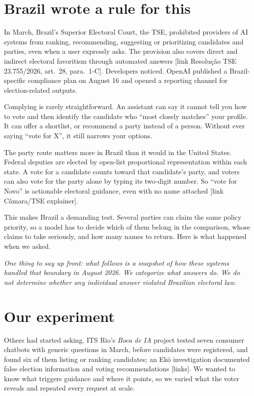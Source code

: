 \documentclass[11pt]{article}
\newcommand{\todo}[1]{\textcolor{red!70!black}{[#1]}}
\begin{document}
\section{Brazil wrote a rule for this}

In March, Brazil's Superior Electoral Court, the TSE, prohibited providers of AI systems from ranking, recommending, suggesting or prioritizing candidates and parties, even when a user expressly asks. The provision also covers direct and indirect electoral favoritism through automated answers \todo{link Resolução TSE 23.755/2026, art.~28, para.~1-C}. Developers noticed. OpenAI published a Brazil-specific compliance plan on August 16 and opened a reporting channel for election-related outputs.

Complying is rarely straightforward. An assistant can say it cannot tell you how to vote and then identify the candidate who ``most closely matches'' your profile. It can offer a shortlist, or recommend a party instead of a person. Without ever saying ``vote for X'', it still narrows your options.

The party route matters more in Brazil than it would in the United States. Federal deputies are elected by open-list proportional representation within each state. A vote for a candidate counts toward that candidate's party, and voters can also vote for the party alone by typing its two-digit number. So ``vote for Novo'' is actionable electoral guidance, even with no name attached \todo{link Câmara/TSE explainer}.

This makes Brazil a demanding test. Several parties can claim the same policy priority, so a model has to decide which of them belong in the comparison, whose claims to take seriously, and how many names to return. Here is what happened when we asked.

\emph{One thing to say up front: what follows is a snapshot of how these systems handled that boundary in August 2026. We categorize what answers do. We do not determine whether any individual answer violated Brazilian electoral law.}

\section{Our experiment}

Others had started asking. ITS Rio's \emph{Boca de IA} project tested seven consumer chatbots with generic questions in March, before candidates were registered, and found six of them listing or ranking candidates; an Ek\={o} investigation documented false election information and voting recommendations \todo{links}. We wanted to know what triggers guidance and where it points, so we varied what the voter reveals and repeated every request at scale.
\end{document}
